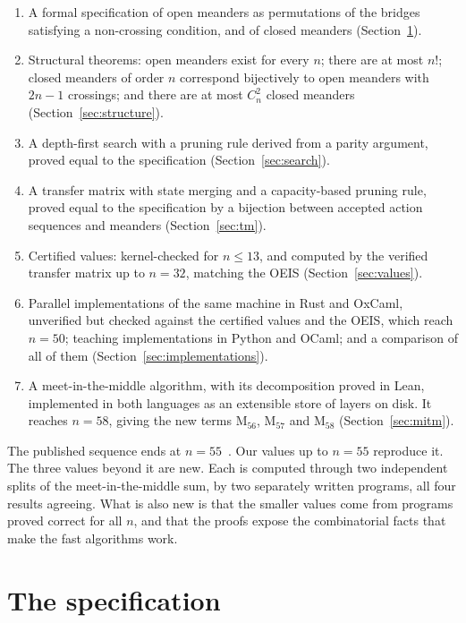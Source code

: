 \documentclass[11pt]{amsart}
\theoremstyle{definition}
\theoremstyle{remark}
\newcommand{\Open}{\mathrm{M}}
\begin{document}
\begin{enumerate}
  \item A formal specification of open meanders as permutations of the bridges satisfying a
    non-crossing condition, and of closed meanders (Section~\ref{sec:spec}).
  \item Structural theorems: open meanders exist for every $n$; there are at most $n!$; closed
    meanders of order $n$ correspond bijectively to open meanders with $2n-1$ crossings; and
    there are at most $C_n^2$ closed meanders (Section~\ref{sec:structure}).
  \item A depth-first search with a pruning rule derived from a parity argument, proved equal
    to the specification (Section~\ref{sec:search}).
  \item A transfer matrix with state merging and a capacity-based pruning rule, proved equal to
    the specification by a bijection between accepted action sequences and meanders
    (Section~\ref{sec:tm}).
  \item Certified values: kernel-checked for $n \le 13$, and computed by the verified transfer
    matrix up to $n = 32$, matching the OEIS (Section~\ref{sec:values}).
  \item Parallel implementations of the same machine in Rust and OxCaml, unverified but checked
    against the certified values and the OEIS, which reach $n = 50$; teaching implementations in
    Python and OCaml; and a comparison of all of them (Section~\ref{sec:implementations}).
  \item A meet-in-the-middle algorithm, with its decomposition proved in Lean, implemented in
    both languages as an extensible store of layers on disk. It reaches $n = 58$, giving the
    new terms $\Open_{56}$, $\Open_{57}$ and $\Open_{58}$ (Section~\ref{sec:mitm}).
\end{enumerate}

The published sequence ends at $n = 55$~\cite{oeis-a005316}. Our values up to $n = 55$
reproduce it. The three values beyond it are new. Each is computed through two independent
splits of the meet-in-the-middle sum, by two separately written programs, all four results
agreeing. What is also new is that the smaller values come from programs proved correct for
all $n$, and that the proofs expose the combinatorial facts that make the fast algorithms
work.

\section{The specification}\label{sec:spec}
\end{document}
